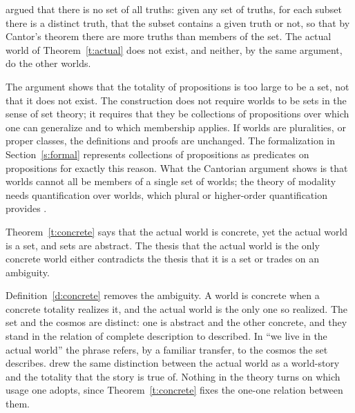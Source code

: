\documentclass{situationist-preprint}
\begin{document}
\begin{objection}
\citet{Grim1991} argued that there is no set of all truths: given any set of truths, for each subset there is a distinct truth, that the subset contains a given truth or not, so that by Cantor's theorem there are more truths than members of the set. The actual world of Theorem~\ref{t:actual} does not exist, and neither, by the same argument, do the other worlds.
\end{objection}

\begin{reply}
The argument shows that the totality of propositions is too large to be a set, not that it does not exist. The construction does not require worlds to be sets in the sense of set theory; it requires that they be collections of propositions over which one can generalize and to which membership applies. If worlds are pluralities, or proper classes, the definitions and proofs are unchanged. The formalization in Section~\ref{s:formal} represents collections of propositions as predicates on propositions for exactly this reason. What the Cantorian argument shows is that worlds cannot all be members of a single set of worlds; the theory of modality needs quantification over worlds, which plural or higher-order quantification provides \citep{Williamson2013}.
\end{reply}

\begin{objection}
Theorem~\ref{t:concrete} says that the actual world is concrete, yet the actual world is a set, and sets are abstract. The thesis that the actual world is the only concrete world either contradicts the thesis that it is a set or trades on an ambiguity.
\end{objection}

\begin{reply}
Definition~\ref{d:concrete} removes the ambiguity. A world is concrete when a concrete totality realizes it, and the actual world is the only one so realized. The set and the cosmos are distinct: one is abstract and the other concrete, and they stand in the relation of complete description to described. In \enquote{we live in the actual world} the phrase refers, by a familiar transfer, to the cosmos the set describes. \citet{Adams1974} drew the same distinction between the actual world as a world-story and the totality that the story is true of. Nothing in the theory turns on which usage one adopts, since Theorem~\ref{t:concrete} fixes the one-one relation between them.
\end{reply}
\end{document}
